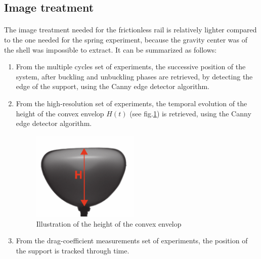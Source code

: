 \subsection{Image treatment}
\paragraph{}
The image treatment needed for the frictionless rail is relatively lighter compared to the one needed for the spring experiment, because the gravity center was of the shell was impossible to extract. It can be summarized as follows:
\begin{enumerate}
<<<<<<< HEAD
		
	\item From the multiple cycles set of experiments, the successive position of the system, after buckling and unbuckling phases are retrieved, by detecting the edge of the support, using the Canny edge detector algorithm.
	
	\item From the high-resolution set of experiments, the temporal evolution of the height of the convex envelop $H(t)$ (see fig.\ref{fig:h_t}) is retrieved, using the Canny edge detector algorithm.
	\begin{figure}[H] %
	\centering%
	\includegraphics[width=0.48\textwidth]{figures/Chapter_1/h.pdf}
	\caption{Illustration of the height of the convex envelop}
	\label{fig:h_t}
\end{figure}
	\item From the drag-coefficient measurements set of experiments, the position of the support is tracked through time.
\end{enumerate}
